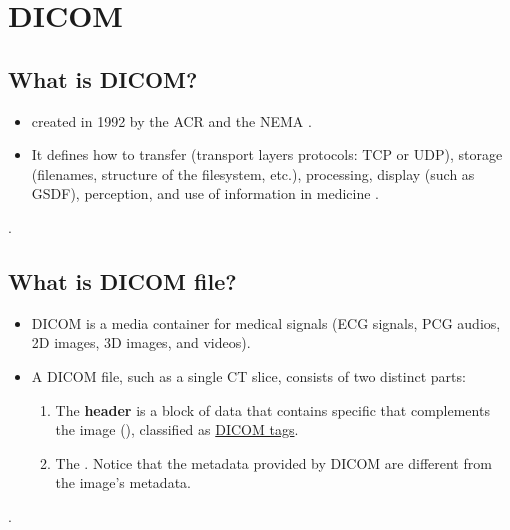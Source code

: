 \chapter{\gls{DICOM}}

\section{What is DICOM?}
\begin{itemize}
\item {}
   created in 1992 by
  the \gls{ACR} and the \gls{NEMA} \cite{DICOM2025}.
\item It defines how to transfer (transport layers protocols:
  \gls{TCP} or \gls{UDP}), storage (filenames, structure of the
  filesystem, etc.), processing, display (such as \gls{GSDF}),
  perception, and use of information in medicine
  \cite{bushberg2011essential}.
\end{itemize}.

\section{What is DICOM file?}
\begin{itemize}
\item \gls{DICOM} is a media container for medical signals
  (\gls{ECG} signals, \gls{PCG} audios, 2D images, 3D images, and videos).
\item A DICOM file, such as a single CT slice, consists of two
  distinct parts:
  \begin{enumerate}
  \item The \textbf{header} is a block of data that contains specific
      that complements the image
    (), classified as
    \href{https://dicom.nema.org/medical/dicom/current/output/html/part06.html#PS3.6}{DICOM
      tags}.
  \item The . Notice that the metadata provided by \gls{DICOM} are
    different from the image's metadata.
  \end{enumerate}
\end{itemize}.

